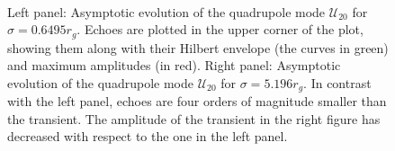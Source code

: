 \documentclass[article,aps,nofootinbib,twocolumn,superscriptaddress]{revtex4-1}
\begin{document}
\begin{figure}
\centering
{} \,
\caption{\label{fig:asympt_two_sigmas} Left panel: Asymptotic evolution of the quadrupole mode $\mathcal{U}_{20}$ for $\sigma=0.6495r_g$. Echoes are plotted in the upper corner of the plot, showing them along with their Hilbert envelope (the curves in green) and maximum amplitudes (in red). Right panel: Asymptotic evolution of the quadrupole mode $\mathcal{U}_{20}$ for $\sigma=5.196r_g$. In contrast with the left panel, echoes are four orders of magnitude smaller than the transient. The amplitude of the transient in the right figure has decreased with respect to the one in the left panel.} 
\end{figure}
\end{document}
